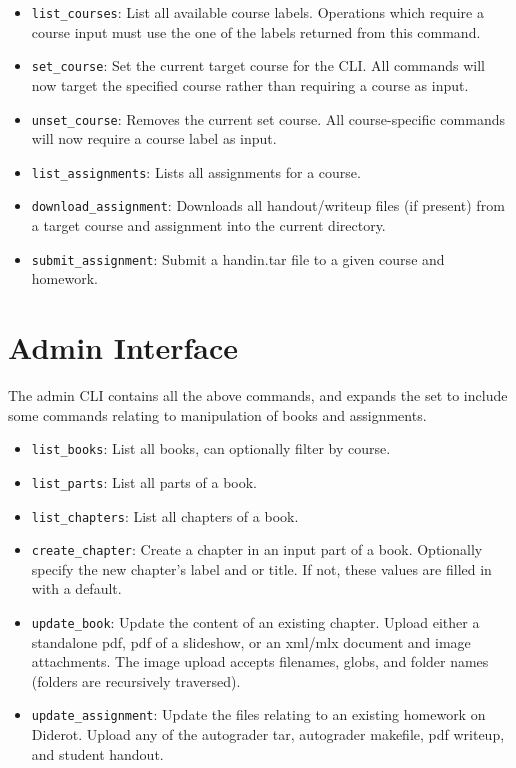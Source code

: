 \begin{itemize}
  \item \verb|list_courses|: List all available course labels.
    Operations which require a course input must use the one of the labels returned from this command.
  \item \verb|set_course|: Set the current target course for the CLI. All commands will now target the
    specified course rather than requiring a course as input.
  \item \verb|unset_course|: Removes the current set course. All course-specific commands
    will now require a course label as input.
  \item \verb|list_assignments|: Lists all assignments for a course.
  \item \verb|download_assignment|: Downloads all handout/writeup files (if present) from a
    target course and assignment into the current directory.
  \item \verb|submit_assignment|: Submit a handin.tar file to a given course and homework.
\end{itemize}


\section{Admin Interface}

The admin CLI contains all the above commands, and expands the set to include
some commands relating to manipulation of books and assignments.

\begin{itemize}
  \item \verb|list_books|: List all books, can optionally filter by course.
  \item \verb|list_parts|: List all parts of a book.
  \item \verb|list_chapters|: List all chapters of a book.
  \item \verb|create_chapter|: Create a chapter in an input part of a book. Optionally specify
    the new chapter's label and or title. If not, these values are filled in with a default.
  \item \verb|update_book|: Update the content of an existing chapter. Upload either
    a standalone pdf, pdf of a slideshow, or an xml/mlx document and image attachments. 
    The image upload accepts filenames, globs, and folder names (folders are recursively traversed).
  \item \verb|update_assignment|: Update the files relating to an existing homework on Diderot.
    Upload any of the autograder tar, autograder makefile, pdf writeup, and student handout.
\end{itemize}



